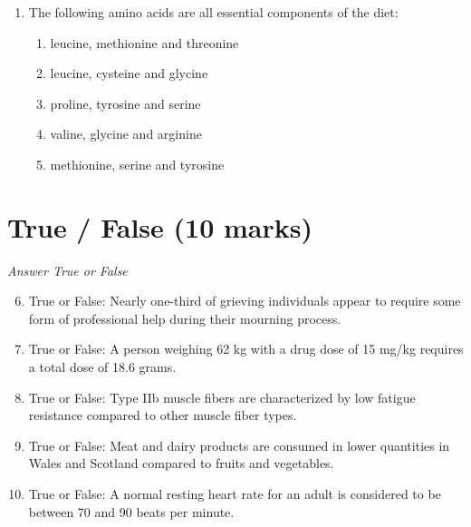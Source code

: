 \documentclass[12pt]{article}
\begin{document}
\begin{enumerate}[label=\arabic*.]
\begin{enumerate}[label=(\alph*)]
    \item the extent to which the total adenine nucleotide pool is phosphorylated.
    \item the difference between the total energy input and output of the cell.
    \item generated by the sodium-potassium ATPase.
    \item the amount of ATP available in the cell.
    \item the energy required for the maintenance of the cell's structure.
\end{enumerate}
\item The following amino acids are all essential components of the diet:
\begin{enumerate}[label=(\alph*)]
    \item leucine, methionine and threonine
    \item leucine, cysteine and glycine
    \item proline, tyrosine and serine
    \item valine, glycine and arginine
    \item methionine, serine and tyrosine
\end{enumerate}
\end{enumerate}

\section*{True / False (10 marks)}
\textit{Answer True or False}
\begin{enumerate}[label=\arabic*.]
\setcounter{enumi}{5}
\item True or False: Nearly one-third of grieving individuals appear to require some form of professional help during their mourning process.
\item True or False: A person weighing 62 kg with a drug dose of 15 mg/kg requires a total dose of 18.6 grams.
\item True or False: Type IIb muscle fibers are characterized by low fatigue resistance compared to other muscle fiber types.
\item True or False: Meat and dairy products are consumed in lower quantities in Wales and Scotland compared to fruits and vegetables.
\item True or False: A normal resting heart rate for an adult is considered to be between 70 and 90 beats per minute.
\end{enumerate}
\end{document}
